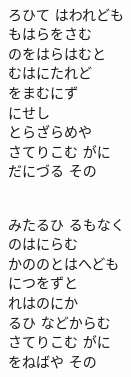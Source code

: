 \documentclass[10pt,b5j]{tarticle} %
\begin{document}
\begin{enumerate} %
    \setlength{\itemindent}{\itemmargin} %
    \begin{minipage}[c]{\blocksize}
        
        \vspace{\linespace}
        \item~\\
        ろひて はわれども\\
        もはらをさむ\\
        のをはらはむと\\
        むはにたれど\\
        をまむにず\\
        にせし\\
        とらざらめや\\
        さてりこむ がに\\
        だにづる その
        
    \end{minipage}
    \begin{minipage}[c]{\blocksize}
        
        \vspace{\linespace}
        \item~\\
        みたるひ るもなく\\
        のはにらむ\\
        かののとはへども\\
        につをずと\\
        れはのにか\\
        るひ などからむ\\
        さてりこむ がに\\
        をねばや その
        

\end{minipage}
\end{enumerate}
\end{document}
